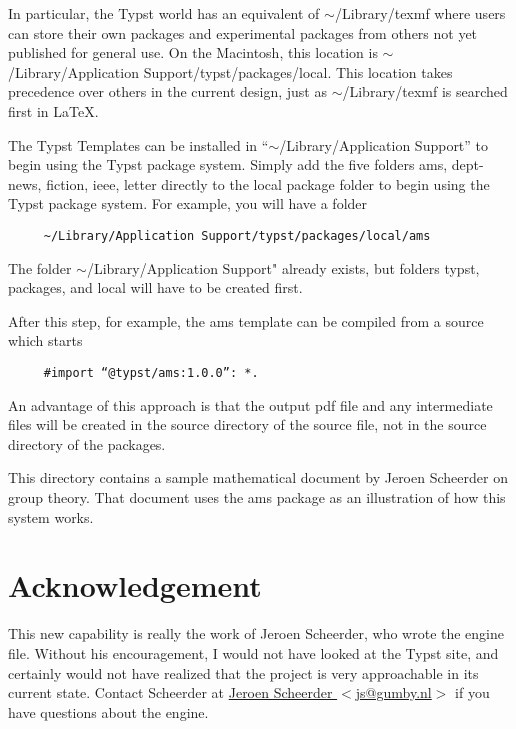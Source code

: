 \documentclass[11pt, oneside]{article}   	%
\begin{document}
In particular, the Typst world has an equivalent of $\sim$/Library/texmf where users can store their own packages and experimental packages from others not yet published for general use. On the Macintosh, this location is 
$\sim$/Library/Application Support/typst/packages/local.   
This location takes precedence over others in the current design, just as $\sim$/Library/texmf is searched first in LaTeX.

The Typst Templates can be installed in ``$\sim$/Library/Application Support''
to begin using the Typst package system.   Simply add the five folders ams, dept-news, fiction, ieee, letter directly to
the local package folder to begin using the Typst package system. For example, you will have a folder
\begin{verbatim}
     ~/Library/Application Support/typst/packages/local/ams
\end{verbatim}
The folder $\sim$/Library/Application Support" already exists, 
but folders typst, packages, and local will have to be created first.

After this step, for example, the ams template can be compiled from a source which starts
\begin{verbatim}
     #import “@typst/ams:1.0.0”: *.
\end{verbatim} 
An advantage of this approach is that the output pdf file and any intermediate files will be created in the source
directory of the source file, not in the source directory of the packages.

This directory contains a sample mathematical document by Jeroen Scheerder on group theory. That document uses the ams package as an illustration of how this system works.

\section{Acknowledgement}

This new capability is really the work of Jeroen Scheerder, who wrote the engine file. Without his encouragement, I would not have  looked at the Typst site,  and certainly would not have realized that the project is very approachable in its current state. Contact Scheerder at \href{mailto:js@gumby.nl}{Jeroen Scheerder $<$js@gumby.nl$>$} if you have questions about the engine.
\end{document}
